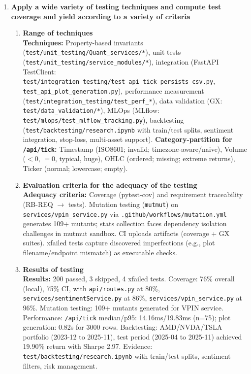 \documentclass[11pt]{article}
\begin{document}
\begin{enumerate}
\begin{enumerate}
\item \textbf{Evaluation of the instrumentation}\\
\textbf{Evaluation:} Instrumentation improves visibility and feedback (CI artifacts, logs, deterministic harnesses). IB variability mitigated via graceful degradation and diagnostics.
\end{enumerate}
\item \textbf{Apply a wide variety of testing techniques and compute test coverage and yield according to a variety of criteria} \marginpar{[default 20\%]}
\begin{enumerate}
\item\textbf{Range of techniques}\\
\textbf{Techniques:} Property-based invariants (\texttt{test/unit\_testing/Quant\_services/*}), unit tests (\texttt{test/unit\_testing/service\_modules/*}), integration (FastAPI TestClient: \texttt{test/integration\_testing/test\_api\_tick\_persists\_csv.py}, \newline\texttt{test\_api\_plot\_generation.py}), performance measurement \newline (\texttt{test/integration\_testing/test\_perf\_*}), data validation (GX: \texttt{test/data\_validation/*}), \newline MLOps (MLflow: \texttt{test/mlops/test\_mlflow\_tracking.py}), \newline backtesting (\texttt{test/backtesting/research.ipynb} with train/test splits, sentiment integration, stop-loss, multi-asset support). \textbf{Category-partition for \texttt{/api/tick}:} Timestamp (ISO8601; invalid; timezone-aware/naive), Volume ($<0$, $=0$, typical, huge), OHLC (ordered; missing; extreme returns), Ticker (normal; lowercase; empty).

\item\textbf{Evaluation criteria for the adequacy of the testing}\\
\textbf{Adequacy criteria:} Coverage (pytest-cov) and requirement traceability (RB-REQ $\rightarrow$ tests). Mutation testing (\texttt{mutmut}) on \texttt{services/vpin\_service.py} via \texttt{.github/workflows/mutation.yml} generates 109+ mutants; stats collection faces dependency isolation challenges in mutmut sandbox. CI uploads artifacts (coverage + GX suites). xfailed tests capture discovered imperfections (e.g., plot filename/endpoint mismatch) as executable checks.

\item\textbf{Results of testing}\\
\textbf{Results:} 200 passed, 3 skipped, 4 xfailed tests. Coverage: 76\% overall (local), 75\% CI, with \texttt{api/routes.py} at 80\%, \texttt{services/sentimentService.py} at 86\%, \texttt{services/vpin\_service.py} at 96\%. Mutation testing: 109+ mutants generated for VPIN service. Performance: \texttt{/api/tick} median/p95: 14.16ms/19.83ms (n=75); plot generation: 0.82s for 3000 rows. Backtesting: AMD/NVDA/TSLA portfolio (2023-12 to 2025-11), test period (2025-04 to 2025-11) achieved 19.90\% return with Sharpe 2.97. Evidence: \texttt{test/backtesting/research.ipynb} with train/test splits, sentiment filters, risk management.


\end{enumerate}
\end{enumerate}
\end{document}
